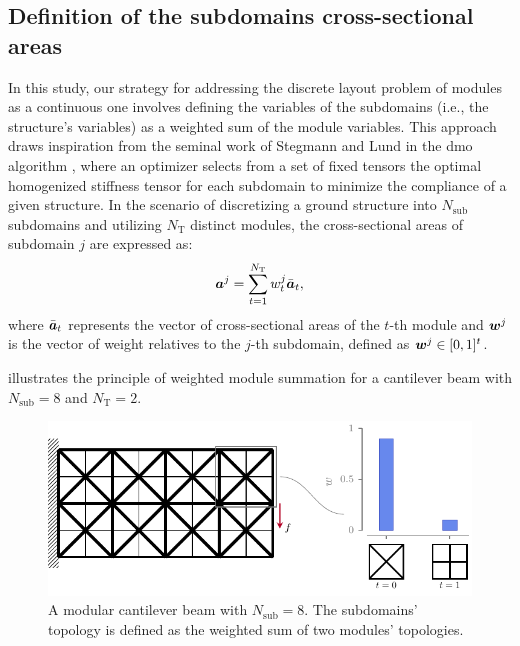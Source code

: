 \subsection{Definition of the subdomains cross-sectional areas}
In this study, our strategy for addressing the discrete layout problem of modules as a continuous one involves defining the variables of the subdomains (i.e., the structure's variables) as a weighted sum of the module variables. This approach draws inspiration from the seminal work of Stegmann and Lund in the \gls{dmo} algorithm , where an optimizer selects from a set of fixed tensors the optimal homogenized stiffness tensor for each subdomain to minimize the compliance of a given structure. In the scenario of discretizing a ground structure into $N_\text{sub}$ subdomains and utilizing $N_\text{T}$ distinct modules, the cross-sectional areas of subdomain $j$ are expressed as:  
\begin{equation}
    \bm{a}^j = \sum_{t=1}^{N_\text{T}} w_t^j \bar{\bm{a}}_t, 
\end{equation}
where $\bar{\bm{a}}_t $ represents the vector of cross-sectional areas of the $t$-th module and $\bm{w}^j$ is the vector of weight relatives to the $j$-th subdomain, defined as $ \bm{w}^j \in [0,1]^t$.

 illustrates the principle of weighted module summation for a cantilever beam with $N_\text{sub}=8$ and $N_\text{T}=2$.

\begin{figure}
    \centering
    \includegraphics{figures/06_DMO/00_weight_dmo/weight_dmo.pdf}
    \caption{A modular cantilever beam with $N_\text{sub}=8$. The subdomains' topology is defined as the weighted sum of two modules' topologies.}
    \label{fig:06_weighted_sum}
\end{figure}

